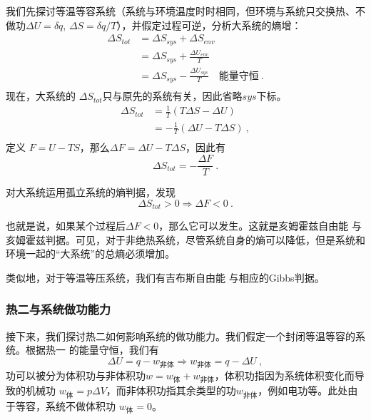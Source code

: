 我们先探讨等温等容系统（系统与环境温度时时相同，但环境与系统只交换热、不做功$\Delta U = \delta q$, $\Delta S = \delta q / T$），并假定过程可逆，分析大系统的熵增：
\begin{equation}
\begin{aligned}
\Delta {S_{tot}}
 &=\Delta {S_{sys}}+\Delta {S_{env}}\\
 & =\Delta {S_{sys}}+ \frac{\Delta U_{{env}}}{T}\\
 & = \Delta {S_{sys}} - \frac{\Delta U_{{sys}}}{T} \quad \text{能量守恒}~.\\
 \end{aligned}
\end{equation}
现在，大系统的 $\Delta {S_{tot}}$只与原先的系统有关，因此省略$sys$下标。
\begin{equation}
\begin{aligned}
\Delta {S_{tot}}
 & = \frac{1}{T}(T \Delta {S} -\Delta U )\\
 & = - \frac{1}{T}(\Delta U - T \Delta {S} )~,\\
\end{aligned}
\end{equation}
定义 $F = U-TS$，那么$\Delta F = \Delta U - T \Delta S$，因此有
\begin{equation}
\Delta S_{tot} = -\frac{\Delta F}{T}~.
\end{equation}

对大系统运用孤立系统的熵判据，发现
\begin{equation}
\Delta S_{tot} > 0\Rightarrow \Delta F < 0~.
\end{equation}

也就是说，如果某个过程后$\Delta F < 0$，那么它可以发生。这就是亥姆霍兹自由能 与 亥姆霍兹判据。可见，对于非绝热系统，尽管系统自身的熵可以降低，但是系统和环境一起的“大系统”的总熵必须增加。

类似地，对于等温等压系统，我们有吉布斯自由能 与相应的Gibbs判据。

\subsubsection{热二与系统做功能力}
接下来，我们探讨热二如何影响系统的做功能力。我们假定一个封闭等温等容的系统。根据热一 的能量守恒，我们有
$$\Delta U = q - w_{\text{非体}} \Rightarrow w_{\text{非体}} = q - \Delta U ~,$$ 
功可以被分为体积功与非体积功$w = w_\text{体}+w_\text{非体}$，体积功指因为系统体积变化而导致的机械功  $w_\text{体}=p\Delta V$，而非体积功指其余类型的功$w_\text{非体}$，例如电功等。此处由于等容，系统不做体积功 $w_\text{体} = 0$。

